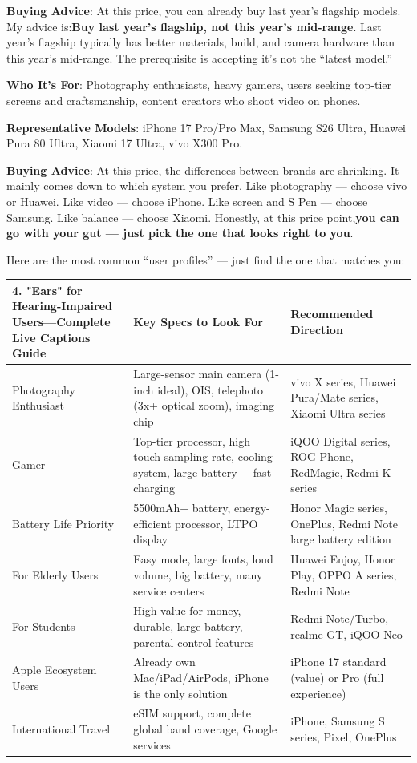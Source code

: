 \textbf{Buying Advice}: At this price, you can already buy last year's flagship models. My advice is:\textbf{Buy last year's flagship, not this year's mid-range}. Last year's flagship typically has better materials, build, and camera hardware than this year's mid-range. The prerequisite is accepting it's not the “latest model.”


\textbf{Who It's For}: Photography enthusiasts, heavy gamers, users seeking top-tier screens and craftsmanship, content creators who shoot video on phones.

\textbf{Representative Models}: iPhone 17 Pro/Pro Max, Samsung S26 Ultra, Huawei Pura 80 Ultra, Xiaomi 17 Ultra, vivo X300 Pro.

\textbf{Buying Advice}: At this price, the differences between brands are shrinking. It mainly comes down to which system you prefer. Like photography — choose vivo or Huawei. Like video — choose iPhone. Like screen and S Pen — choose Samsung. Like balance — choose Xiaomi. Honestly, at this price point,\textbf{you can go with your gut — just pick the one that looks right to you}.


Here are the most common “user profiles” — just find the one that matches you:

\begin{center}
\begin{tabularx}{\linewidth}{|X|X|X|}
\hline
\textbf{4. "Ears" for Hearing-Impaired Users—Complete Live Captions Guide} & \textbf{Key Specs to Look For} & \textbf{Recommended Direction} \tabularnewline
\hline
Photography Enthusiast & Large-sensor main camera (1-inch ideal), OIS, telephoto (3x+ optical zoom), imaging chip & vivo X series, Huawei Pura/Mate series, Xiaomi Ultra series \tabularnewline
Gamer & Top-tier processor, high touch sampling rate, cooling system, large battery + fast charging & iQOO Digital series, ROG Phone, RedMagic, Redmi K series \tabularnewline
Battery Life Priority & 5500mAh+ battery, energy-efficient processor, LTPO display & Honor Magic series, OnePlus, Redmi Note large battery edition \tabularnewline
For Elderly Users & Easy mode, large fonts, loud volume, big battery, many service centers & Huawei Enjoy, Honor Play, OPPO A series, Redmi Note \tabularnewline
For Students & High value for money, durable, large battery, parental control features & Redmi Note/Turbo, realme GT, iQOO Neo \tabularnewline
Apple Ecosystem Users & Already own Mac/iPad/AirPods, iPhone is the only solution & iPhone 17 standard (value) or Pro (full experience) \tabularnewline
International Travel & eSIM support, complete global band coverage, Google services & iPhone, Samsung S series, Pixel, OnePlus \tabularnewline
\hline
\end{tabularx}
\end{center}

